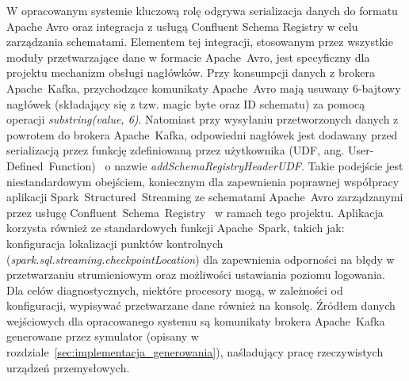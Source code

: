 \begin{enumerate}
W opracowanym systemie kluczową rolę odgrywa serializacja danych do formatu Apache Avro oraz integracja z usługą Confluent Schema Registry w celu zarządzania schematami. Elementem tej integracji, stosowanym przez wszystkie moduły przetwarzające dane w formacie \mbox{Apache Avro}, jest specyficzny dla projektu mechanizm obsługi nagłówków. Przy konsumpcji danych z brokera \mbox{Apache Kafka}, przychodzące komunikaty \mbox{Apache Avro} mają usuwany 6-bajtowy nagłówek (składający się z tzw. magic byte oraz ID schematu) za pomocą operacji \textit{substring(value, 6)}. Natomiast przy wysyłaniu przetworzonych danych z powrotem do brokera \mbox{Apache Kafka}, odpowiedni nagłówek jest dodawany przed serializacją przez funkcję zdefiniowaną przez użytkownika (UDF, ang. \mbox{User-Defined Function})~\cite{spark_udf} o nazwie \textit{addSchemaRegistryHeaderUDF}. Takie podejście jest niestandardowym obejściem, koniecznym dla zapewnienia poprawnej współpracy aplikacji \mbox{Spark Structured Streaming} ze schematami \mbox{Apache Avro} zarządzanymi przez usługę \mbox{Confluent Schema Registry}~\cite{confluent_schema_registry} w ramach tego projektu. Aplikacja korzysta również ze standardowych funkcji \mbox{Apache Spark}, takich jak: konfiguracja lokalizacji punktów kontrolnych (\textit{\mbox{spark.sql.streaming.checkpointLocation}}) dla zapewnienia odporności na błędy w przetwarzaniu strumieniowym oraz możliwości ustawiania poziomu logowania. Dla celów diagnostycznych, niektóre procesory mogą, w zależności od konfiguracji, wypisywać przetwarzane dane również na konsolę. Źródłem danych wejściowych dla opracowanego systemu są komunikaty brokera \mbox{Apache Kafka} generowane przez symulator (opisany w rozdziale~\ref{sec:implementacja_generowania}), naśladujący pracę rzeczywistych urządzeń przemysłowych.

\end{enumerate}